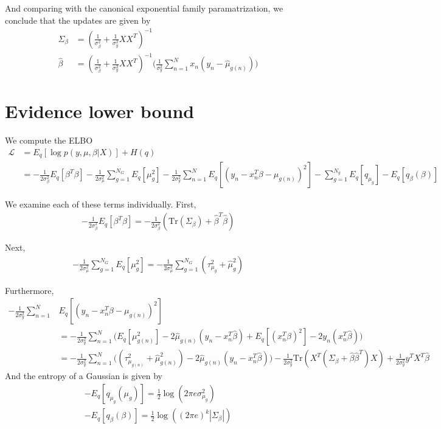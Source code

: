 \documentclass[10pt]{article}
\theoremstyle{plain}
\theoremstyle{definition}
\newcommand{\<}{\langle}
\renewcommand{\>}{\rangle}
\begin{document}
And comparing with the canonical exponential family paramatrization, we conclude that the updates are given by
\begin{align*}
\Sigma_\beta &= (\frac{1}{\sigma^2_\beta} + \frac{1}{\sigma^2_y}XX^T)^{-1}\\
\hat\beta &= (\frac{1}{\sigma^2_\beta} + \frac{1}{\sigma^2_y}XX^T)^{-1}\Big(\frac{1}{\sigma^2_y}\sum_{n=1}^N  x_n(y_n - \hat\mu_{g(n)} )\Big)
\end{align*}



\section{Evidence lower bound}
We compute the ELBO
\begin{align}
\mathcal L &= E_q[\log p(y,\mu,\beta|X)] + H(q) \\
	&=-\frac{1}{2\sigma^2_\beta}E_q[\beta^T\beta] - \frac{1}{2\sigma^2_\mu}\sum_{g=1}^{N_G} E_q[\mu_g^2] - \frac{1}{2\sigma^2_y}\sum_{n=1}^N E_q[(y_n - x_n^T\beta - \mu_{g(n)})^2] -\sum_{g=1}^{N_g}E_q[q_{\mu_g}] - E_q[q_\beta(\beta)]
\end{align} 

We examine each of these terms individually. First, 
\begin{align}
-\frac{1}{2\sigma^2_\beta} E_q[\beta^T\beta] = -\frac{1}{2\sigma^2_\beta} (\text{Tr}(\Sigma_\beta) + \hat \beta^T \hat\beta) 
\end{align}

Next, 
\begin{align*}
- \frac{1}{2\sigma^2_\mu}\sum_{g=1}^{N_G} E_q[\mu_g^2] = - \frac{1}{2\sigma^2_\mu}\sum_{g=1}^{N_G}(\tau^2_{\mu_g} + \hat\mu_g^2)
\end{align*}

Furthermore, 
\begin{align*}
 - \frac{1}{2\sigma^2_y}\sum_{n=1}^N &E_q[(y_n - x_n^T\beta - \mu_{g(n)})^2] \\
 &=  - \frac{1}{2\sigma^2_y}\sum_{n=1}^N \Big(E_q[\mu_{g(n)}^2] - 2\hat\mu_{g(n)}(y_n - x_n^T\hat\beta) + E_q[(x_n^T\beta)^2] - 2y_n (x_n^T\hat\beta)\Big)\\
 &= - \frac{1}{2\sigma^2_y}\sum_{n=1}^N \Big((\tau^2_{\mu_{g(n)}} + \hat\mu_{g(n)}^2) - 2\hat\mu_{g(n)}(y_n - x_n^T\hat\beta)\Big) - \frac{1}{2\sigma^2_y} \text{Tr}(X^T(\Sigma_\beta + \hat\beta\hat\beta^T)X) + \frac{1}{2\sigma^2_y} y^TX^T\hat\beta
\end{align*}
And the entropy of a Gaussian is given by 
\begin{align*}
-E_q[q_{\mu_g}(\mu_g)] = \frac{1}{2} \log(2\pi e \sigma_{\mu_g}^2)\\
-E_q[q_{\beta}(\beta)] = \frac{1}{2} \log((2\pi e)^k |\Sigma_{\beta}|)
\end{align*}
\end{document}
